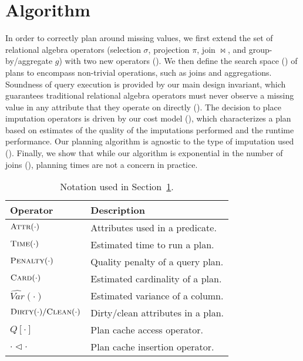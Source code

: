 \section{Algorithm}
\label{sec:algorithm}
In order to correctly plan around missing values, we first extend the set of relational algebra operators (selection $\sigma$, projection $\pi$, join $\bowtie$, and group-by/aggregate $g$) 
with two new operators (). We then define the search space () of plans to encompass non-trivial operations, such as joins and 
aggregations. Soundness of query execution is provided by our main design invariant, which guarantees traditional relational
algebra operators must never observe a missing value in any attribute that they operate on directly (). 
The decision to place imputation operators is driven by our cost model (), which characterizes a plan based on estimates of the 
quality of the imputations performed and the runtime performance. Our planning algorithm is
agnostic to the type of imputation used ().
Finally, we show that while our algorithm is exponential in the number of joins (), planning times are not a concern in practice.

\begin{table}
  \centering
  \caption{Notation used in Section~\ref{sec:algorithm}.}
  \begin{tabular}{ll}
    \toprule
    Operator & Description \\
    \midrule
    $\textsc{Attr}(\cdot)$ & Attributes used in a predicate. \\
    $\textsc{Time}(\cdot)$ & Estimated time to run a plan. \\
    $\textsc{Penalty}(\cdot)$ & Quality penalty of a query plan. \\
    $\textsc{Card}(\cdot)$ & Estimated cardinality of a plan. \\
    $\widehat{Var}(\cdot)$ & Estimated variance of a column. \\
    $\textsc{Dirty}(\cdot)/\textsc{Clean}(\cdot)$ & Dirty/clean attributes in a plan. \\
    $Q[\cdot]$ & Plan cache access operator. \\
    $\cdot \triangleleft \cdot$ & Plan cache insertion operator. \\
    \bottomrule
  \end{tabular}
\end{table}

